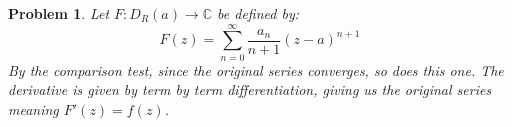 \documentclass{article}
\theoremstyle{plain}
\theoremstyle{normal}
\newtheorem{problem}{Problem}[section]
\begin{document}
        \begin{problem}
            Let $F:D_{R}(a)\rightarrow\mathbb{C}$ be defined by:
            \begin{equation}
                F(z)=\sum_{n=0}^{\infty}\frac{a_{n}}{n+1}(z-a)^{n+1}
            \end{equation}
            By the comparison test, since the original series converges, so
            does this one. The derivative is given by term by term
            differentiation, giving us the original series meaning $F'(z)=f(z)$.
        \end{problem}
\end{document}
